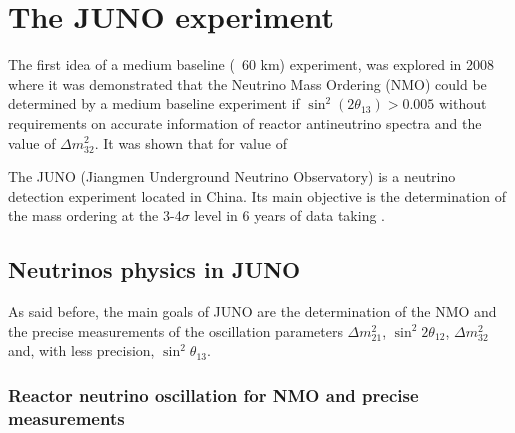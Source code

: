 \chapter{The JUNO experiment}

The first idea of a medium baseline (~60 km) experiment, was explored in 2008 where it was demonstrated that the Neutrino Mass Ordering (NMO) could be determined by a medium baseline experiment if $\sin^2(2\theta_{13}) > 0.005$ without requirements on accurate information of reactor antineutrino spectra and the value of $\Delta m_{32}^2$. \cite{zhan_determination_2008}
It was shown that for value of 


The JUNO (Jiangmen Underground Neutrino Observatory) is a neutrino detection experiment located in China. Its main objective is the determination of the mass ordering at the 3-4$\sigma$ level in 6 years of data taking \cite{an_neutrino_2016}.

\section{Neutrinos physics in JUNO}

As said before, the main goals of JUNO are the determination of the NMO and the precise measurements of the oscillation parameters $\Delta m_{21}^2$, $\sin^2 2\theta_{12}$, $\Delta m_{32}^2$ and, with less precision, $\sin^2\theta_{13}$. 

\subsection{Reactor neutrino oscillation for NMO and precise measurements}

